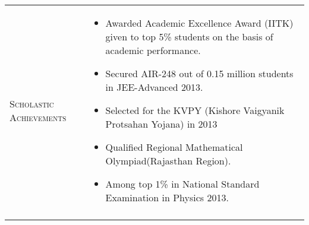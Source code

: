 \documentclass[a4paper]{article}
\begin{document}
\centering
\begin{longtable}{@{}m{3.0cm}m{14cm}@{}}

  \textrm{\textsc {Scholastic Achievements}} & 
                                               \begin{itemize} \itemsep -2pt
                                               \item
                                                 Awarded Academic Excellence Award (IITK) given to top 5\% students on the basis of academic performance.
                                               \item
                                                 Secured AIR-248 out of 0.15 million students in JEE-Advanced 2013.
                                               \item
                                                 Selected for the KVPY (Kishore Vaigyanik Protsahan Yojana) in 2013
                                               \item
                                                 Qualified Regional Mathematical Olympiad(Rajasthan Region).
                                               \item
                                                 Among top 1\% in National Standard Examination in Physics 2013.
                                               \end{itemize}
  \\ \\ 


\end{longtable}
\end{document}
